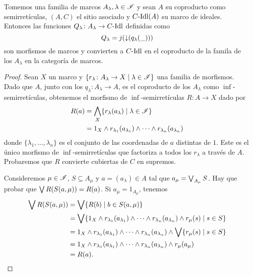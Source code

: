 \begin{lemma}
  Tomemos una familia de marcos $A_\lambda, \lambda\in\mathscr{I}$ y sean
  $A$ su coproducto como semirretículas, $(A,C)$ el sitio asociado y
  $C\text{-}\mathrm{Idl}(A)$ su marco de ideales. Entonces las funciones
  $Q_\lambda\colon A_\lambda\to C\text{-}\mathrm{Idl}$ definidas como
    \[
        Q_\lambda=j({\downarrow}(q_\lambda(\_)))
    \]
  son morfismos de marcos y convierten a $C\text{-}\mathrm{Idl}$ 
  en el coproducto de la famila de los $A_\lambda$
  en la categoría de marcos.
\end{lemma}
\begin{proof}

Sean $X$ un marco y
$\{r_\lambda\colon A_\lambda\to X\mid \lambda\in \mathscr{I}\}$
una familia de morfismos.
Dado que $A$, junto con los $q_\lambda:A_\lambda\to A$,
es el coproducto de los $A_\lambda$ como $\inf$-semirretículas,
obtenemos el morfismo de $\inf$-semirretículas
$R\colon A\to X$ dado por
\begin{align*}
    R(a)
    &=\bigwedge_X \{r_\lambda(a_\lambda)\mid \lambda\in\mathscr{I}\} \\
    &= 1_X\wedge r_{\lambda_1}(a_{\lambda_1})\wedge\cdots\wedge r_{\lambda_n}(a_{\lambda_n})
\end{align*}
donde $\{\lambda_1,\dots,\lambda_n\}$ es el conjunto
de las coordenadas de $a$ distintas de $1$.
Este es el único morfismo de $\inf$-semirretículas que
factoriza a todos los $r_\lambda$ a través de $A$.
Probaremos que $R$ convierte cubiertas de $C$ en supremos.

Consideremos $\mu\in\mathscr{I}$, $S\subseteq A_\mu$ y $a=(a_\lambda)\in A$ tal que $a_\mu=\bigvee_{A_\mu} S$.
Hay que probar que $\bigvee R(S(a,\mu)) = R(a)$.
Si $a_\mu= 1_{A_\mu}$, tenemos
\begin{align*}
    \bigvee R(S(a,\mu))
    &= \bigvee\{R(b) \mid b\in S(a,\mu)\} \\
    &= \bigvee\{ 1_X\wedge r_{\lambda_1}(a_{\lambda_1})\wedge
        \cdots\wedge r_{\lambda_n}(a_{\lambda_n}) \wedge r_\mu(s) \mid s\in S\} \\
    &= 1_X\wedge r_{\lambda_1}(a_{\lambda_1})\wedge
        \cdots\wedge r_{\lambda_n}(a_{\lambda_n}) \wedge
        \bigvee\{ r_\mu(s) \mid s\in S\} \\
    &= 1_X\wedge r_{\lambda_1}(a_{\lambda_1})\wedge
        \cdots\wedge r_{\lambda_n}(a_{\lambda_n}) \wedge
        r_\mu(a_\mu) \\
    &= R(a).
\end{align*}


\end{proof}
